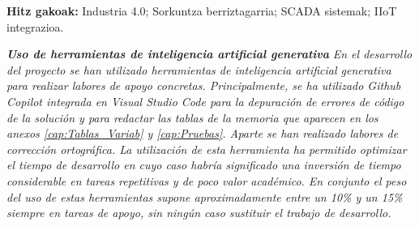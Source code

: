 \textbf{Hitz gakoak:} Industria 4.0; Sorkuntza berriztagarria; SCADA sistemak; \ac{IIoT} integrazioa.


\vfill
\textit{\textbf{Uso de herramientas de inteligencia artificial generativa}}
\textit{
En el desarrollo del proyecto se han utilizado herramientas de inteligencia artificial generativa para realizar labores de apoyo concretas. Principalmente, se ha utilizado Github Copilot integrada en Visual Studio Code para la depuración de errores de código de la solución y para redactar las tablas de la memoria que aparecen en los anexos \ref{cap:Tablas_Variab} y \ref{cap:Pruebas}. Aparte se han realizado labores de corrección ortográfica. La utilización de esta herramienta ha permitido optimizar el tiempo de desarrollo en cuyo caso habría significado una inversión de tiempo considerable en tareas repetitivas y de poco valor académico. En conjunto el peso del uso de estas herramientas supone aproximadamente entre un 10\% y un 15\% siempre en tareas de apoyo, sin ningún caso sustituir el trabajo de desarrollo.}